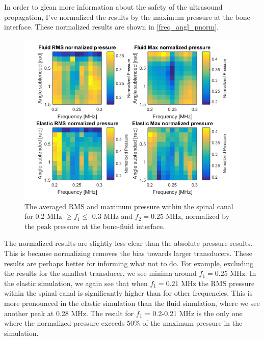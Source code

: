 \documentclass[10pt,a4paper]{article}
\begin{document}
  
In order to glean more information about the safety of the ultrasound propagation, I've normalized the results by the maximum pressure at the bone interface. These normalized results are shown in \autoref{freq_angl_pnorm}. 
\begin{figure}[H]
\includegraphics[scale=0.8]{freq_angle_pnorm}
\caption{The averaged  RMS and maximum pressure within the spinal canal for   0.2 MHz $\geq f_1 \leq$ 0.3 MHz and $f_2 = 0.25$ MHz, normalized by the peak pressure at the bone-fluid interface.}
\label{freq_angle_pnorm}
\end{figure}

The normalized results are slightly less clear than the absolute pressure results. This is because normalizing removes the bias towards larger transducers. These results are perhaps better for informing what not to do. For example, excluding the results for the smallest transducer, we see minima around $f_1 = 0.25$ MHz. In the elastic simulation, we again see that when $f_1 = 0.21$ MHz the RMS pressure within the spinal canal is significantly higher than for other frequencies. This is more pronounced in the elastic simulation than the fluid simulation, where we see another peak at 0.28 MHz. The result for $f_1$ = 0.2-0.21 MHz is the only one where the normalized pressure exceeds 50\% of the maximum pressure in the simulation. 

\newpage
{}

\end{document}
